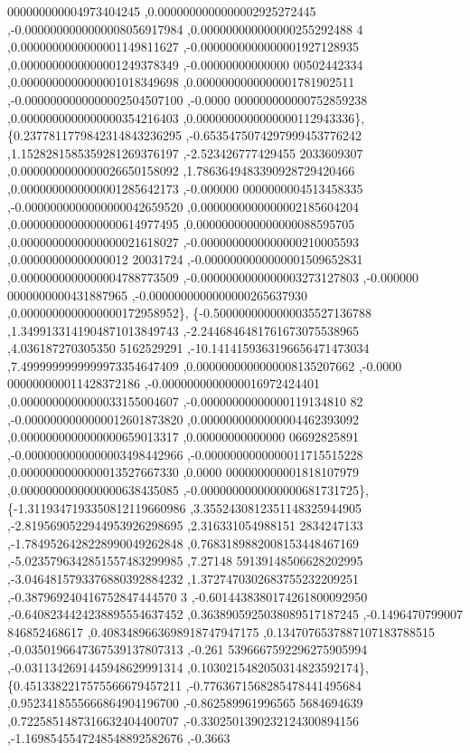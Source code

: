 \begin{DoxyCode}
      000000000004973404245 ,0.0000000000000002925272445 ,-0.0000000000000008056917984 ,0.000000000000000255292488
      4 ,0.0000000000000001149811627 ,-0.0000000000000001927128935 ,0.0000000000000001249378349 ,-0.00000000000000
      00502442334 ,0.0000000000000001018349698 ,0.0000000000000001781902511 ,-0.0000000000000002504507100 ,-0.0000
      000000000000752859238 ,0.0000000000000000354216403 ,0.0000000000000000112943336\},
\{0.2377811779842314843236295 ,-0.6535475074297999453776242 ,1.1528281585359281269376197 ,-2.523426777429455
      2033609307 ,0.0000000000000026650158092 ,1.7863649483390928729420466 ,0.0000000000000001285642173 ,-0.000000
      0000000004513458335 ,-0.0000000000000000042659520 ,0.0000000000000002185604204 ,0.0000000000000000614977495 
      ,0.0000000000000000088595705 ,0.0000000000000000021618027 ,-0.0000000000000000210005593 ,0.00000000000000012
      20031724 ,-0.0000000000000001509652831 ,0.0000000000000004788773509 ,-0.0000000000000003273127803 ,-0.000000
      0000000000431887965 ,-0.0000000000000000265637930 ,0.0000000000000000172958952\},
\{-0.5000000000000035527136788 ,1.3499133141904871013849743 ,-2.2446846481761673075538965 ,4.036187270305350
      5162529291 ,-10.1414159363196656471473034 ,7.4999999999999973354647409 ,0.0000000000000008135207662 ,-0.0000
      000000000011428372186 ,-0.0000000000000016972424401 ,0.0000000000000033155004607 ,-0.00000000000000119134810
      82 ,-0.0000000000000012601873820 ,0.0000000000000004462393092 ,0.0000000000000000659013317 ,0.00000000000000
      06692825891 ,-0.0000000000000003498442966 ,-0.0000000000000011715515228 ,0.0000000000000013527667330 ,0.0000
      000000000001818107979 ,0.0000000000000000638435085 ,-0.0000000000000000681731725\},
\{-1.3119347193350812119660986 ,3.3552430812351148325944905 ,-2.8195690522944953926298695 ,2.316331054988151
      2834247133 ,-1.7849526428228990049262848 ,0.7683189882008153448467169 ,-5.0235796342851557483299985 ,7.27148
      59139148506628202995 ,-3.0464815793376880392884232 ,1.3727470302683755232209251 ,-0.387969240416752847444570
      3 ,-0.6014438380174261800092950 ,-0.6408234424238895554637452 ,0.3638905925038089517187245 ,-0.1496470799007
      846852468617 ,0.4083489663698918747947175 ,0.1347076537887107183788515 ,-0.0350196647367539137807313 ,-0.261
      5396667592296275905994 ,-0.0311342691445948629991314 ,0.1030215482050314823592174\},
\{0.4513382217575566679457211 ,-0.7763671568285478441495684 ,0.9523418555666864904196700 ,-0.862589961996565
      5684694639 ,0.7225851487316632404400707 ,-0.3302501390232124300894156 ,-1.1698545547248548892582676 ,-0.3663

\end{DoxyCode}
